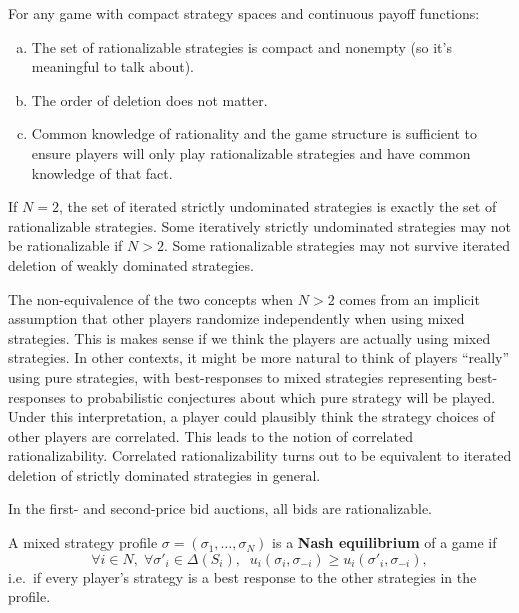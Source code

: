 \documentclass[10pt]{article}
\begin{document}
\begin{spacing}{1.0}
\begin{theorem}
  For any game with compact
  strategy spaces and continuous payoff functions:
  \begin{enumerate}[a)]\leftskip = 1em
  \item The set of rationalizable strategies is compact and
    nonempty (so it's meaningful to talk about).
  \item The order of deletion does not matter.
  \item Common knowledge of rationality and the game structure is
    sufficient to ensure players will only play rationalizable strategies
    and have common knowledge of that fact.
  \end{enumerate}
\end{theorem}

\begin{theorem}
  If $N=2$, the set of iterated strictly
  undominated strategies is exactly the set of rationalizable
  strategies. Some iteratively strictly undominated strategies may not be
  rationalizable if $N>2$. Some rationalizable strategies may not survive
  iterated deletion of weakly dominated strategies.
\end{theorem}

The non-equivalence of the two concepts when $N>2$ comes from an implicit
assumption that other players randomize independently when using mixed
strategies. This is makes sense if we think the players are
actually using mixed strategies. In other contexts, it might be more
natural to think of players ``really'' using pure strategies, with best-responses to
mixed strategies representing best-responses to probabilistic conjectures
about which pure strategy will be played. Under this interpretation, a player could
plausibly think the strategy choices of other players are correlated. This
leads to the notion of correlated rationalizability. Correlated
rationalizability turns out to be equivalent to iterated deletion of
strictly dominated strategies in general.

\begin{theorem}
  In the first- and second-price bid auctions, all bids are rationalizable.
\end{theorem}

\begin{definition}
  A mixed strategy profile $\sigma = \left(\sigma_1,
    \ldots, \sigma_N\right)$ is a \textbf{Nash equilibrium} of a game
  if \[\forall i \in N,\; \forall \sigma'_i\in \Delta(S_i),\;\;
  u_i(\sigma_i, \sigma_{-i}) \geq u_i(\sigma'_i, \sigma_{-i}),\] i.e.~if
  every player's strategy is a best response to the other strategies in the
  profile.
\end{definition}


\end{spacing}
\end{document}
